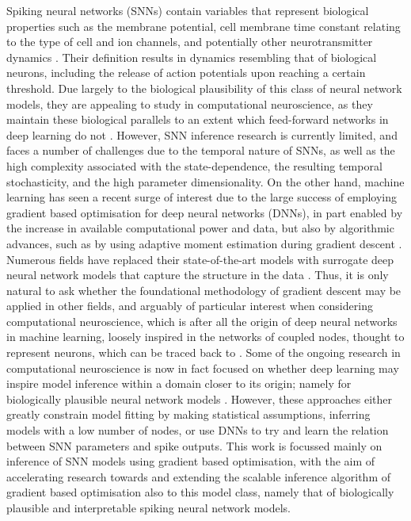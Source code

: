 \documentclass[mphil,deptreport,ianc]{infthesis} %
\begin{document}


Spiking neural networks (SNNs) contain variables that represent biological properties such as the membrane potential, cell membrane time constant relating to the type of cell and ion channels, and potentially other neurotransmitter dynamics \cite{Johnson2017}.
Their definition results in dynamics resembling that of biological neurons, including the release of action potentials upon reaching a certain threshold.
Due largely to the biological plausibility of this class of neural network models, they are appealing to study in computational neuroscience, as they maintain these biological parallels to an extent which feed-forward networks in deep learning do not \cite{Wu2018, Taherkhani2018, Taherkhani2020}.
However, SNN inference research is currently limited, and faces a number of challenges due to the temporal nature of SNNs, as well as the high complexity associated with the state-dependence, the resulting temporal stochasticity, and the high parameter dimensionality.
On the other hand, machine learning has seen a recent surge of interest due to the large success of employing gradient based optimisation for deep neural networks (DNNs), in part enabled by the increase in available computational power and data, but also by algorithmic advances, such as by using adaptive moment estimation during gradient descent \cite{Schmidhuber2014, Bengio2011}.
Numerous fields have replaced their state-of-the-art models with surrogate deep neural network models that capture the structure in the data \cite{Lueckmann2018, Lueckmann2021, Tejero-Cantero2020, Cranmer2020, Greenberg}.
Thus, it is only natural to ask whether the foundational methodology of gradient descent may be applied in other fields, and arguably of particular interest when considering computational neuroscience, which is after all the origin of deep neural networks in machine learning, loosely inspired in the networks of coupled nodes, thought to represent neurons, which can be traced back to \cite{McCulloch1943}.
Some of the ongoing research in computational neuroscience is now in fact focused on whether deep learning may inspire model inference within a domain closer to its origin; namely for biologically plausible neural network models \cite{GrunSonjaRotter2010, Schwalger2017, Taherkhani2020}.
However, these approaches either greatly constrain model fitting by making statistical assumptions, inferring models with a low number of nodes, or use DNNs to try and learn the relation between SNN parameters and spike outputs.
This work is focussed mainly on inference of SNN models using gradient based optimisation, with the aim of accelerating research towards and extending the scalable inference algorithm of gradient based optimisation also to this model class, namely that of biologically plausible and interpretable spiking neural network models.
\end{document}
